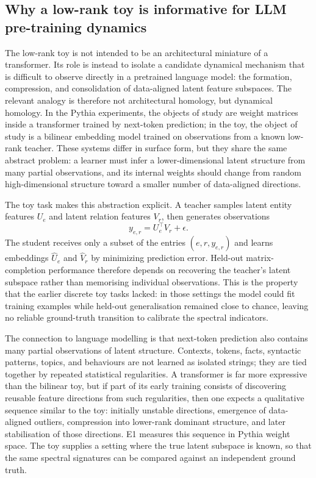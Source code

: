 \subsection{Why a low-rank toy is informative for LLM pre-training dynamics}
\label{sec:toy_llm_connection}

The low-rank toy is not intended to be an architectural miniature of a transformer. Its role is instead to isolate a candidate dynamical mechanism that is difficult to observe directly in a pretrained language model: the formation, compression, and consolidation of data-aligned latent feature subspaces. The relevant analogy is therefore not architectural homology, but dynamical homology. In the Pythia experiments, the objects of study are weight matrices inside a transformer trained by next-token prediction; in the toy, the object of study is a bilinear embedding model trained on observations from a known low-rank teacher. These systems differ in surface form, but they share the same abstract problem: a learner must infer a lower-dimensional latent structure from many partial observations, and its internal weights should change from random high-dimensional structure toward a smaller number of data-aligned directions.

The toy task makes this abstraction explicit. A teacher samples latent entity features $U_e$ and latent relation features $V_r$, then generates observations
\[
    y_{e,r} = U_e^\top V_r + \epsilon.
\]
The student receives only a subset of the entries $(e,r,y_{e,r})$ and learns embeddings $\hat U_e$ and $\hat V_r$ by minimizing prediction error. Held-out matrix-completion performance therefore depends on recovering the teacher's latent subspace rather than memorising individual observations. This is the property that the earlier discrete toy tasks lacked: in those settings the model could fit training examples while held-out generalisation remained close to chance, leaving no reliable ground-truth transition to calibrate the spectral indicators.

The connection to language modelling is that next-token prediction also contains many partial observations of latent structure. Contexts, tokens, facts, syntactic patterns, topics, and behaviours are not learned as isolated strings; they are tied together by repeated statistical regularities. A transformer is far more expressive than the bilinear toy, but if part of its early training consists of discovering reusable feature directions from such regularities, then one expects a qualitative sequence similar to the toy: initially unstable directions, emergence of data-aligned outliers, compression into lower-rank dominant structure, and later stabilisation of those directions. E1 measures this sequence in Pythia weight space. The toy supplies a setting where the true latent subspace is known, so that the same spectral signatures can be compared against an independent ground truth.

